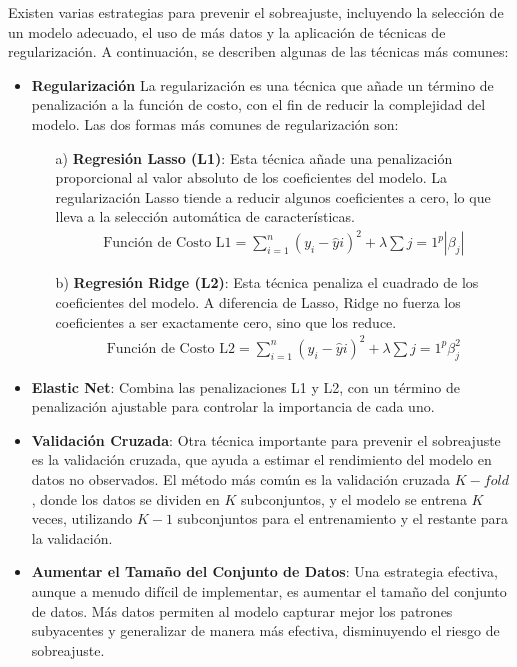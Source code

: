 \documentclass[a4paper]{report} %
\begin{document}
Existen varias estrategias para prevenir el sobreajuste, incluyendo la selección de un modelo adecuado, el uso de más datos y la aplicación de técnicas de regularización. A continuación, se describen algunas de las técnicas más comunes:

\begin{itemize}

\item \textbf{Regularizaci\'on} La regularización es una técnica que añade un término de penalización a la función de costo, con el fin de reducir la complejidad del modelo. Las dos formas más comunes de regularización son:

\begin{itemize} 
\item[a) ] \textbf{Regresión Lasso (L1)}: Esta técnica añade una penalización proporcional al valor absoluto de los coeficientes del modelo. La regularización Lasso tiende a reducir algunos coeficientes a cero, lo que lleva a la selección automática de características. \begin{eqnarray} 
\text{Función de Costo L1} = \sum_{i=1}^{n} (y_i - \hat{y}i)^2 + \lambda \sum{j=1}^{p} |\beta_j| 
\end{eqnarray} 

\item[b) ] \textbf{Regresión Ridge (L2)}: Esta técnica penaliza el cuadrado de los coeficientes del modelo. A diferencia de Lasso, Ridge no fuerza los coeficientes a ser exactamente cero, sino que los reduce. 
\begin{eqnarray} 
\text{Función de Costo L2} = \sum_{i=1}^{n} (y_i - \hat{y}i)^2 + \lambda \sum{j=1}^{p} \beta_j^2 
\end{eqnarray} 
\end{itemize}

\item \textbf{Elastic Net}: Combina las penalizaciones L1 y L2, con un término de penalización ajustable para controlar la importancia de cada uno. 

\item \textbf{Validación Cruzada}: Otra técnica importante para prevenir el sobreajuste es la validación cruzada, que ayuda a estimar el rendimiento del modelo en datos no observados. El método más común es la validación cruzada $K-fold$, donde los datos se dividen en $K$ subconjuntos, y el modelo se entrena $K$ veces, utilizando $K-1$ subconjuntos para el entrenamiento y el restante para la validación.

\item \textbf{Aumentar el Tamaño del Conjunto de Datos}: Una estrategia efectiva, aunque a menudo difícil de implementar, es aumentar el tamaño del conjunto de datos. Más datos permiten al modelo capturar mejor los patrones subyacentes y generalizar de manera más efectiva, disminuyendo el riesgo de sobreajuste.


\end{itemize}
\end{document}
